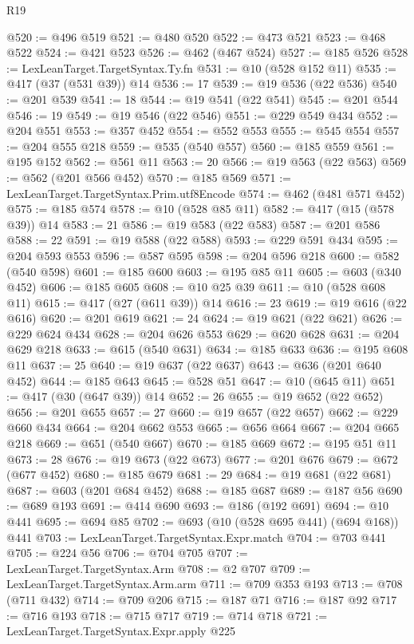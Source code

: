 \begin{lexlean}{R19}
\begin{coremodule}
@520 := @496 @519
@521 := @480 @520
@522 := @473 @521
@523 := @468 @522
@524 := @421 @523
@526 := @462 (@467 @524)
@527 := @185 @526
@528 := LexLeanTarget.TargetSyntax.Ty.fn
@531 := @10 (@528 @152 @11)
@535 := @417 (@37 (@531 @39)) @14
@536 := 17
@539 := @19 @536 (@22 @536)
@540 := @201 @539
@541 := 18
@544 := @19 @541 (@22 @541)
@545 := @201 @544
@546 := 19
@549 := @19 @546 (@22 @546)
@551 := @229 @549 @434
@552 := @204 @551
@553 := @357 @452
@554 := @552 @553
@555 := @545 @554
@557 := @204 @555 @218
@559 := @535 (@540 @557)
@560 := @185 @559
@561 := @195 @152
@562 := @561 @11
@563 := 20
@566 := @19 @563 (@22 @563)
@569 := @562 (@201 @566 @452)
@570 := @185 @569
@571 := LexLeanTarget.TargetSyntax.Prim.utf8Encode
@574 := @462 (@481 @571 @452)
@575 := @185 @574
@578 := @10 (@528 @85 @11)
@582 := @417 (@15 (@578 @39)) @14
@583 := 21
@586 := @19 @583 (@22 @583)
@587 := @201 @586
@588 := 22
@591 := @19 @588 (@22 @588)
@593 := @229 @591 @434
@595 := @204 @593 @553
@596 := @587 @595
@598 := @204 @596 @218
@600 := @582 (@540 @598)
@601 := @185 @600
@603 := @195 @85 @11
@605 := @603 (@340 @452)
@606 := @185 @605
@608 := @10 @25 @39
@611 := @10 (@528 @608 @11)
@615 := @417 (@27 (@611 @39)) @14
@616 := 23
@619 := @19 @616 (@22 @616)
@620 := @201 @619
@621 := 24
@624 := @19 @621 (@22 @621)
@626 := @229 @624 @434
@628 := @204 @626 @553
@629 := @620 @628
@631 := @204 @629 @218
@633 := @615 (@540 @631)
@634 := @185 @633
@636 := @195 @608 @11
@637 := 25
@640 := @19 @637 (@22 @637)
@643 := @636 (@201 @640 @452)
@644 := @185 @643
@645 := @528 @51
@647 := @10 (@645 @11)
@651 := @417 (@30 (@647 @39)) @14
@652 := 26
@655 := @19 @652 (@22 @652)
@656 := @201 @655
@657 := 27
@660 := @19 @657 (@22 @657)
@662 := @229 @660 @434
@664 := @204 @662 @553
@665 := @656 @664
@667 := @204 @665 @218
@669 := @651 (@540 @667)
@670 := @185 @669
@672 := @195 @51 @11
@673 := 28
@676 := @19 @673 (@22 @673)
@677 := @201 @676
@679 := @672 (@677 @452)
@680 := @185 @679
@681 := 29
@684 := @19 @681 (@22 @681)
@687 := @603 (@201 @684 @452)
@688 := @185 @687
@689 := @187 @56
@690 := @689 @193
@691 := @414 @690
@693 := @186 (@192 @691)
@694 := @10 @441
@695 := @694 @85
@702 := @693 (@10 (@528 @695 @441) (@694 @168)) @441
@703 := LexLeanTarget.TargetSyntax.Expr.match
@704 := @703 @441
@705 := @224 @56
@706 := @704 @705
@707 := LexLeanTarget.TargetSyntax.Arm
@708 := @2 @707
@709 := LexLeanTarget.TargetSyntax.Arm.arm
@711 := @709 @353 @193
@713 := @708 (@711 @432)
@714 := @709 @206
@715 := @187 @71
@716 := @187 @92
@717 := @716 @193
@718 := @715 @717
@719 := @714 @718
@721 := LexLeanTarget.TargetSyntax.Expr.apply @225

\end{coremodule}
\end{lexlean}
